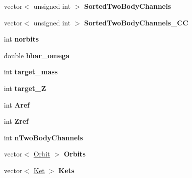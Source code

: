 \begin{DoxyCompactItemize}
\item 
vector$<$ unsigned int $>$ {\bfseries Sorted\+Two\+Body\+Channels}\hypertarget{classModelSpace_aaea26da5a75b807edc787f99ac7df922}{}\label{classModelSpace_aaea26da5a75b807edc787f99ac7df922}

\item 
vector$<$ unsigned int $>$ {\bfseries Sorted\+Two\+Body\+Channels\+\_\+\+CC}\hypertarget{classModelSpace_a9707a32e9f56698cd10cece2843f1478}{}\label{classModelSpace_a9707a32e9f56698cd10cece2843f1478}

\item 
int {\bfseries norbits}\hypertarget{classModelSpace_af5970e6865dd69177eb0f74fa269ff17}{}\label{classModelSpace_af5970e6865dd69177eb0f74fa269ff17}

\item 
double {\bfseries hbar\+\_\+omega}\hypertarget{classModelSpace_ac443b316ecf89bf3476ba6f541f3563c}{}\label{classModelSpace_ac443b316ecf89bf3476ba6f541f3563c}

\item 
int {\bfseries target\+\_\+mass}\hypertarget{classModelSpace_ac0ef9c553ca3db16a019205d6c8a2b26}{}\label{classModelSpace_ac0ef9c553ca3db16a019205d6c8a2b26}

\item 
int {\bfseries target\+\_\+Z}\hypertarget{classModelSpace_a6fc5c2a8fed28f70114a3dd81b93fe74}{}\label{classModelSpace_a6fc5c2a8fed28f70114a3dd81b93fe74}

\item 
int {\bfseries Aref}\hypertarget{classModelSpace_a81d21aa5d47ef8cdcd00cd166fc5a561}{}\label{classModelSpace_a81d21aa5d47ef8cdcd00cd166fc5a561}

\item 
int {\bfseries Zref}\hypertarget{classModelSpace_aa6f60ad193a7602da82501d0f76a00ca}{}\label{classModelSpace_aa6f60ad193a7602da82501d0f76a00ca}

\item 
int {\bfseries n\+Two\+Body\+Channels}\hypertarget{classModelSpace_aea2ac4cf6e2f53d7cd96b208cbc165f3}{}\label{classModelSpace_aea2ac4cf6e2f53d7cd96b208cbc165f3}

\item 
vector$<$ \hyperlink{classOrbit}{Orbit} $>$ {\bfseries Orbits}\hypertarget{classModelSpace_a07dd6979fc18b46e5d1d2d59730f196a}{}\label{classModelSpace_a07dd6979fc18b46e5d1d2d59730f196a}

\item 
vector$<$ \hyperlink{classKet}{Ket} $>$ {\bfseries Kets}\hypertarget{classModelSpace_ab5c86a92d1f74b4a7cb10e7fcb18f44c}{}\label{classModelSpace_ab5c86a92d1f74b4a7cb10e7fcb18f44c}


\end{DoxyCompactItemize}
